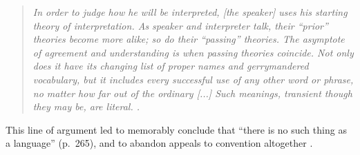 \begin{quote}
\emph{In order to judge how he will be interpreted, [the speaker] uses his starting theory of interpretation. %
As speaker and interpreter talk, their ``prior'' theories become more alike; so do their ``passing'' theories. 
The asymptote of agreement and understanding is when passing theories coincide. 
Not only does it have its changing list of proper names and gerrymandered vocabulary, but it includes every successful use of any other word or phrase, no matter how far out of the ordinary [...] 
Such meanings, transient though they may be, are literal. \cite[p.~258]{davidson_nice_1986}.}
\end{quote}

This line of argument led  to memorably conclude that ``there is no such thing as a language'' (p.~265), and to abandon appeals to convention altogether \cite<see also>[for discussion]{heck_idiolect,lepore2007reality,hacking1986nice,dummett1994}.%

